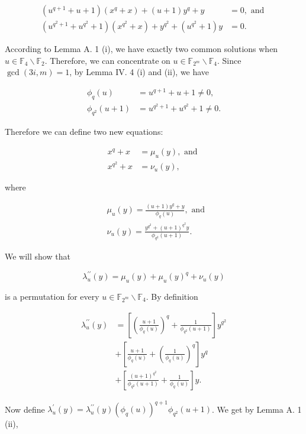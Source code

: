 \documentclass[10pt]{article}
\begin{document}
$$
\begin{aligned}
\left(u^{q+1}+u+1\right)\left(x^{q}+x\right)+(u+1) y^{q}+y & =0, \text { and } \\
\left(u^{q^{2}+1}+u^{q^{2}}+1\right)\left(x^{q^{2}}+x\right)+y^{q^{2}}+\left(u^{q^{2}}+1\right) y & =0 .
\end{aligned}
$$

According to Lemma A. 1 (i), we have exactly two common solutions when $u \in \mathbb{F}_{4} \backslash \mathbb{F}_{2}$. Therefore, we can concentrate on $u \in \mathbb{F}_{2^{m}} \backslash \mathbb{F}_{4}$. Since $\operatorname{gcd}(3 i, m)=1$, by Lemma IV. 4 (i) and (ii), we have

$$
\begin{aligned}
\phi_{q}(u) & =u^{q+1}+u+1 \neq 0, \\
\phi_{q^{2}}(u+1) & =u^{q^{2}+1}+u^{q^{2}}+1 \neq 0 .
\end{aligned}
$$

Therefore we can define two new equations:


\begin{align*}
x^{q}+x & =\mu_{u}(y), \text { and }  \tag{8}\\
x^{q^{2}}+x & =\nu_{u}(y), \tag{9}
\end{align*}


where

$$
\begin{aligned}
& \mu_{u}(y)=\frac{(u+1) y^{q}+y}{\phi_{q}(u)}, \text { and } \\
& \nu_{u}(y)=\frac{y^{q^{2}}+(u+1)^{q^{2}} y}{\phi_{q^{2}}(u+1)} .
\end{aligned}
$$

We will show that

$$
\lambda_{u}^{\prime \prime}(y)=\mu_{u}(y)+\mu_{u}(y)^{q}+\nu_{u}(y)
$$

is a permutation for every $u \in \mathbb{F}_{2^{m}} \backslash \mathbb{F}_{4}$. By definition


\begin{align*}
\lambda_{u}^{\prime \prime}(y) & =\left[\left(\frac{u+1}{\phi_{q}(u)}\right)^{q}+\frac{1}{\phi_{q^{2}}(u+1)}\right] y^{q^{2}} \\
& +\left[\frac{u+1}{\phi_{q}(u)}+\left(\frac{1}{\phi_{q}(u)}\right)^{q}\right] y^{q} \\
& +\left[\frac{(u+1)^{q^{2}}}{\phi_{q^{2}}(u+1)}+\frac{1}{\phi_{q}(u)}\right] y . \tag{10}
\end{align*}


Now define $\lambda_{u}^{\prime}(y)=\lambda_{u}^{\prime \prime}(y)\left(\phi_{q}(u)\right)^{q+1} \phi_{q^{2}}(u+1)$. We get by Lemma A. 1 (ii),
\end{document}
